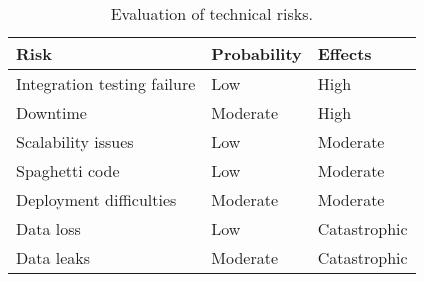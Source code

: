 \begin{table}[p]
\centering
    \begin{tabular}{| l | l | l |}
        \hline
        \textbf{Risk}                   & \textbf{Probability}  & \textbf{Effects}  \\
        \hline
        Integration testing failure     & Low                   & High              \\
        \hline
        Downtime                        & Moderate              & High              \\
        \hline
        Scalability issues              & Low                   & Moderate          \\
        \hline
        Spaghetti code                  & Low                   & Moderate          \\
        \hline
        Deployment difficulties         & Moderate              & Moderate          \\
        \hline
        Data loss                       & Low                   & Catastrophic      \\
        \hline
        Data leaks                      & Moderate              & Catastrophic      \\
        \hline
    \end{tabular}
    \caption{Evaluation of technical risks.}
    \label{tab:technical-risks}
\end{table}
